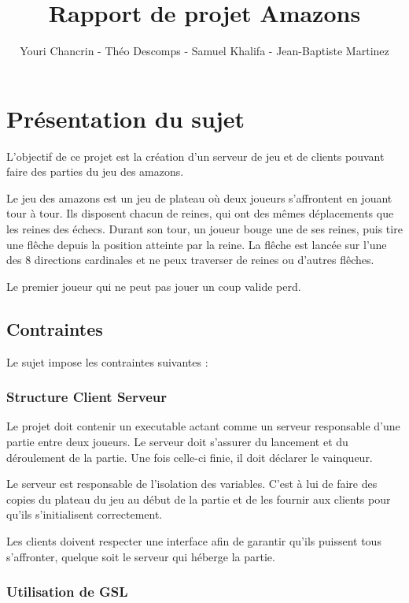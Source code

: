 \documentclass{article}
\author{Youri Chancrin - Théo Descomps - Samuel Khalifa - Jean-Baptiste Martinez}
\title{Rapport de projet Amazons}
\begin{document}
\maketitle

\section{Présentation du sujet}

L'objectif de ce projet est la création d'un serveur de jeu et de clients pouvant faire des parties 
du jeu des amazons.

Le jeu des amazons est un jeu de plateau où deux joueurs s'affrontent en jouant tour à tour.
Ils disposent chacun de reines, qui ont des mêmes déplacements que les reines des échecs.
Durant son tour, un joueur bouge une de ses reines, puis tire une flêche depuis la position atteinte par la reine.
La flêche est lancée sur l'une des 8 directions cardinales et ne peux traverser de reines ou d'autres flêches.

Le premier joueur qui ne peut pas jouer un coup valide perd.

\subsection{Contraintes}
Le sujet impose les contraintes suivantes :

\subsubsection{Structure Client Serveur}

Le projet doit contenir un executable actant comme un serveur responsable d'une partie entre deux joueurs.
Le serveur doit s'assurer du lancement et du déroulement de la partie. Une fois celle-ci finie, 
il doit déclarer le vainqueur.

Le serveur est responsable de l'isolation des variables. 
C'est à lui de faire des copies du plateau du jeu au début de la partie et de les fournir aux clients 
pour qu'ils s'initialisent correctement.

Les clients doivent respecter une interface afin de garantir qu'ils puissent tous s'affronter,
quelque soit le serveur qui héberge la partie.

\subsubsection{Utilisation de GSL}
\end{document}
